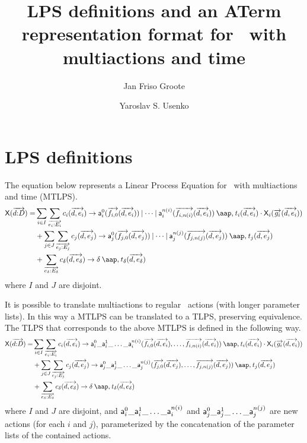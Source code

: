 \documentclass[fleqn,a4paper]{article}
\title{LPS definitions and an ATerm representation format for \mcrl\
  with multiactions and time}
\author{Jan Friso Groote \and Yaroslav S. Usenko}
\begin{document}
\maketitle
\tableofcontents

\section{LPS definitions}

The equation below represents a Linear Process Equation for \mcrl\
with multiactions and time (MTLPS).
\begin{gather}
\begin{split}
\pr{X}(\vect{d\ap D})=&\sum_{i\in I}\sum_{\vect{e_i\ap E_i}} c_i(\vect{d,e_i})\to\act{a}^0_i(\vect{f_{i,0}}(\vect{d,e_i}))\comm\dots\comm\act{a}^{n(i)}_i(\vect{f_{i,n(i)}}(\vect{d,e_i}))\at t_i(\vect{d,e_i})\seqc
\pr{X}_i(\vect{g_i}(\vect{d,e_i}))\notag\\
&+\sum_{j\in J}\sum_{\vect{e_j\ap E_j}} c_j(\vect{d,e_j})\to\act{a}^0_j(\vect{f_{j,0}}(\vect{d,e_j}))\comm\dots\comm\act{a}^{n(j)}_j(\vect{f_{j,n(j)}}(\vect{d,e_j}))\at t_j(\vect{d,e_j})\\
&+\sum_{\vect{e_\delta\ap E_\delta}} c_\delta(\vect{d,e_\delta})\to\delta\at t_\delta(\vect{d,e_\delta})
\end{split}
\end{gather}
where $I$ and $J$ are disjoint.

It is possible to translate multiactions to regular \mcrl\ actions
(with longer parameter lists).  In this way a MTLPS can be translated
to a TLPS, preserving equivalence.  The TLPS that corresponds to the
above MTLPS is defined in the following way.
\begin{gather}
\begin{split}
\pr{X}(\vect{d\ap D})=&\sum_{i\in I}\sum_{\vect{e_i\ap E_i}} c_i(\vect{d,e_i})\to\act{a}^0_i\_\act{a}^1_i\_\dots\_\act{a}^{n(i)}_i(\vect{f_{i,0}}(\vect{d,e_i}),\dots,\vect{f_{i,n(i)}}(\vect{d,e_i}))\at t_i(\vect{d,e_i})\seqc
\pr{X}_i(\vect{g_i}(\vect{d,e_i}))\notag\\
&+\sum_{j\in J}\sum_{\vect{e_j\ap E_j}} c_j(\vect{d,e_j})\to\act{a}^0_j\_\act{a}^1_j\_\dots\_\act{a}^{n(j)}_j(\vect{f_{j,0}}(\vect{d,e_j}),\dots,\vect{f_{j,n(j)}}(\vect{d,e_j}))\at t_j(\vect{d,e_j})\\
&+\sum_{\vect{e_\delta\ap E_\delta}} c_\delta(\vect{d,e_\delta})\to\delta\at t_\delta(\vect{d,e_\delta})
\end{split}
\end{gather}
where $I$ and $J$ are disjoint, and
$\mathsf{a}^0_i\_\mathsf{a}^1_i\_\dots\_\mathsf{a}^{n(i)}_i$ and
$\mathsf{a}^0_j\_\mathsf{a}^1_j\_\dots\_\mathsf{a}^{n(j)}_j$ are new actions
(for each $i$ and $j$), parameterized by the concatenation of the
parameter lists of the contained actions.
\end{document}
